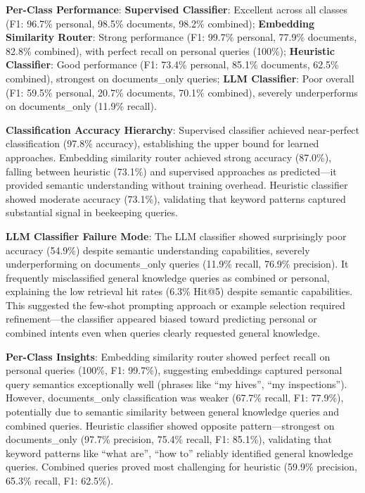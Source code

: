 \documentclass[twocolumn,10pt]{article}
\begin{document}
\textbf{Per-Class Performance}: \textbf{Supervised Classifier}: Excellent across all classes (F1: 96.7\% personal, 98.5\% documents, 98.2\% combined); \textbf{Embedding Similarity Router}: Strong performance (F1: 99.7\% personal, 77.9\% documents, 82.8\% combined), with perfect recall on personal queries (100\%); \textbf{Heuristic Classifier}: Good performance (F1: 73.4\% personal, 85.1\% documents, 62.5\% combined), strongest on documents\_only queries; \textbf{LLM Classifier}: Poor overall (F1: 59.5\% personal, 20.7\% documents, 70.1\% combined), severely underperforms on documents\_only (11.9\% recall).

\textbf{Classification Accuracy Hierarchy}: Supervised classifier achieved near-perfect classification (97.8\% accuracy), establishing the upper bound for learned approaches. Embedding similarity router achieved strong accuracy (87.0\%), falling between heuristic (73.1\%) and supervised approaches as predicted---it provided semantic understanding without training overhead. Heuristic classifier showed moderate accuracy (73.1\%), validating that keyword patterns captured substantial signal in beekeeping queries.

\textbf{LLM Classifier Failure Mode}: The LLM classifier showed surprisingly poor accuracy (54.9\%) despite semantic understanding capabilities, severely underperforming on documents\_only queries (11.9\% recall, 76.9\% precision). It frequently misclassified general knowledge queries as combined or personal, explaining the low retrieval hit rates (6.3\% Hit@5) despite semantic capabilities. This suggested the few-shot prompting approach or example selection required refinement---the classifier appeared biased toward predicting personal or combined intents even when queries clearly requested general knowledge.

\textbf{Per-Class Insights}: Embedding similarity router showed perfect recall on personal queries (100\%, F1: 99.7\%), suggesting embeddings captured personal query semantics exceptionally well (phrases like ``my hives'', ``my inspections''). However, documents\_only classification was weaker (67.7\% recall, F1: 77.9\%), potentially due to semantic similarity between general knowledge queries and combined queries. Heuristic classifier showed opposite pattern---strongest on documents\_only (97.7\% precision, 75.4\% recall, F1: 85.1\%), validating that keyword patterns like ``what are'', ``how to'' reliably identified general knowledge queries. Combined queries proved most challenging for heuristic (59.9\% precision, 65.3\% recall, F1: 62.5\%).
\end{document}
